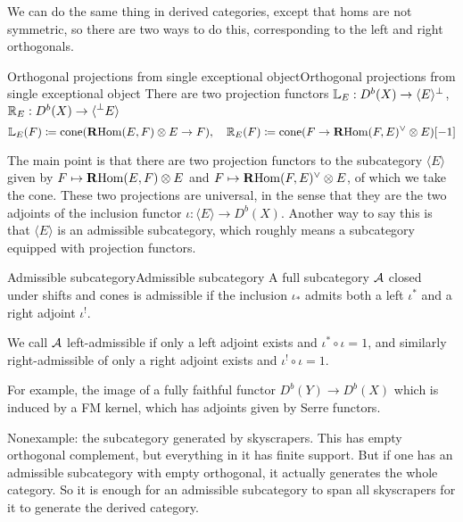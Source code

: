 We can do the same thing in derived categories, except that homs are not symmetric, so there are two ways to do this, corresponding to the left and right orthogonals.

\begin{definition}{Orthogonal projections from single exceptional object}{Orthogonal projections from single exceptional object}
    There are two projection functors $\mathbb{L}_E:D^b(X)\to\langle E\rangle ^\perp$, $\mathbb{R}_E:D^b(X)\to\langle \prescript{\perp}{}{E}\rangle$
    \begin{equation*}
        \mathbb{L}_E(F) \coloneqq \operatorname{cone}(\operatorname{\mathbf{R} Hom}(E,F)\otimes E \to F), \quad
        \mathbb{R}_E(F) \coloneqq \operatorname{cone}(F\to\operatorname{\mathbf{R} Hom}(F,E)^\lor\otimes E )[-1]
    \end{equation*}
\end{definition}


The main point is that there are two projection functors to the subcategory $\langle E \rangle$ given by $F\mapsto\operatorname{\mathbf{R} Hom}(E,F)\otimes E$ and $F\mapsto\operatorname{\mathbf{R} Hom}(F,E)^\lor\otimes E$, of which we take the cone. These two projections are universal, in the sense that they are the two adjoints of the inclusion functor $\iota:\langle E \rangle \to D^b(X)$. Another way to say this is that $\langle E \rangle$ is an admissible subcategory, which roughly means a subcategory equipped with projection functors.

\begin{definition}{Admissible subcategory}{Admissible subcategory}
    A full subcategory $\mathcal{A}$ closed under shifts and cones is admissible if the inclusion $\iota_*$ admits both a left $\iota^*$ and a right adjoint $\iota^!$.

    We call $\mathcal{A}$ left-admissible if only a left adjoint exists and $\iota^*\circ \iota=1$, and similarly right-admissible of only a right adjoint exists and $\iota^! \circ \iota=1$.
\end{definition}

For example, the image of a fully faithful functor $D^b(Y)\to D^b(X)$ which is induced by a FM kernel, which has adjoints given by Serre functors. 

Nonexample: the subcategory generated by skyscrapers. This has empty orthogonal complement, but everything in it has finite support. But if one has an admissible subcategory with empty orthogonal, it actually generates the whole category. So it is enough for an admissible subcategory to span all skyscrapers for it to generate the derived category.

